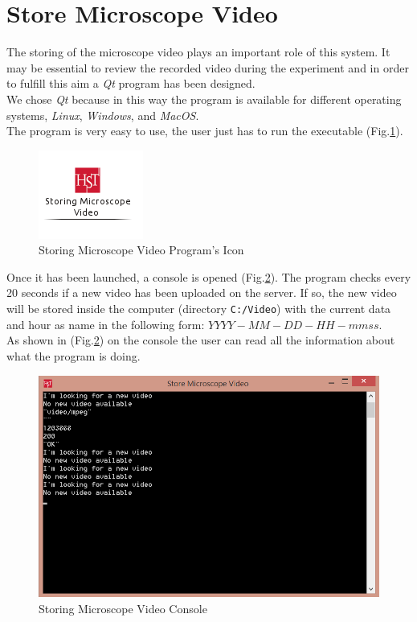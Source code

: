 \documentclass[12pt,a4paper,twoside]{article}
\begin{document}
	\section*{Store Microscope Video}
	The storing of the microscope video plays an important role of this system. It may be essential to review the recorded video  during the experiment and in order to fulfill this aim a \textit{Qt} program has been designed.\\
	We chose \textit{Qt} because in this way the program is available for different operating systems, \textit{Linux}, \textit{Windows}, and \textit{MacOS}.\\
	
	The program is very easy to use, the user just has to run the executable (Fig.\ref{Fig:icostoring}).
	
	\begin{figure}[h]
		\begin{center}
			\includegraphics[scale=.5]{storing/Icon}
			\caption{Storing Microscope Video Program's Icon}
			\label{Fig:icostoring}
		\end{center}
	\end{figure}
	
	Once it has been launched, a console is opened (Fig.\ref{Fig:storingwindows}). The program checks every 20 seconds if a new video has been uploaded on the server. If so, the new video will be stored inside the computer (directory \texttt{C:/Video}) with the current data and hour as name in the following form: $YYYY-MM-DD-HH-mmss$.\\
	
	As shown in (Fig.\ref{Fig:storingwindows}) on the console the user can read all the information about what the program is doing.
	
	\begin{figure}[h]
		\begin{center}
			\includegraphics[scale=.7]{storing/program-windows}
			\caption{Storing Microscope Video Console}
			\label{Fig:storingwindows}
		\end{center}
	\end{figure}
	
\end{document}

